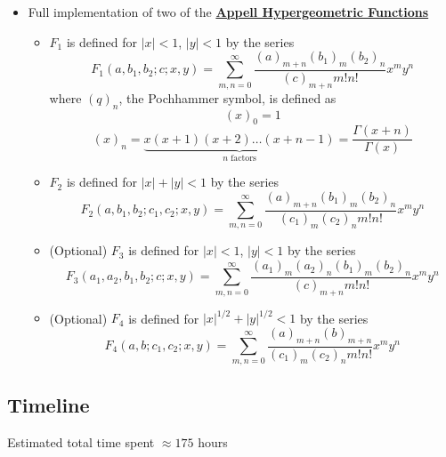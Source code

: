\documentclass{article}
\theoremstyle{mytheoremstyle}
\theoremstyle{mytheoremstyle}
\theoremstyle{myproblemstyle}
\begin{document}
\begin{itemize}
        \item Full implementation of two of the \href{https://en.wikipedia.org/wiki/Appell_series}{\textbf{Appell Hypergeometric Functions}} \cite{appell, nist appell, mhs asb} 
          \begin{itemize}
            \item $F_1 $ is defined for $\lvert x  \rvert <1 $, $\lvert y  \rvert < 1 $ by the series \[
              F_1(a,b_1,b_2;c;x,y)=\displaystyle\sum_{m,n=0 }^{\infty } \displaystyle\frac{(a)_{m+n }(b_1)_{m }(b_2)_{n }}{(c)_{m+n}m!n! }x ^m y^n 
            \] 
              where $(q)_n $, the Pochhammer symbol, is defined as \[
                (x)_0=1\] \[
                (x)_n = \underbrace{x(x+1)(x+2)\dots(x+n-1)}_{n\text{ factors}}
                = \displaystyle\frac{\Gamma (x+n)}{\Gamma(x)}
              \] 
            \item $F_2 $ is defined for $\lvert x  \rvert +\lvert y  \rvert < 1 $ by the series \[
              F_2(a,b_1,b_2;c_1,c_2;x,y)=\displaystyle\sum_{m,n=0 }^{\infty } \displaystyle\frac{(a)_{m+n }(b_1)_{m }(b_2)_{n }}{(c_1)_{m}(c_2)_{n}m!n! }x ^m y^n 
            \] 
            \item (Optional) $F_3 $ is defined for $\lvert x  \rvert <1 $, $\lvert y  \rvert < 1 $ by the series \[
              F_3(a_1,a_2,b_1,b_2;c;x,y)=\displaystyle\sum_{m,n=0 }^{\infty } \displaystyle\frac{(a_1)_{m}(a_2)_{n}(b_1)_{m }(b_2)_{n }}{(c)_{m+n}m!n! }x ^m y^n 
            \] 
            \item (Optional) $F_4 $ is defined for $\lvert x  \rvert ^{1/2} +\lvert y  \rvert ^{1/2}< 1 $ by the series \[
              F_4(a,b;c_1,c_2;x,y)=\displaystyle\sum_{m,n=0 }^{\infty } \displaystyle\frac{(a)_{m+n }(b)_{m+n }}{(c_1)_{m}(c_2)_{n}m!n! }x ^m y^n 
            \] 
          \end{itemize}
      \end{itemize}
    \newpage
    \subsection*{Timeline}
      Estimated total time spent $\approx 175 $ hours 
\end{document}
